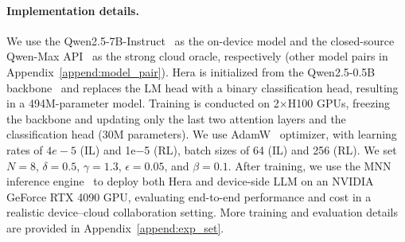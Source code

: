 \documentclass{article}
\newcommand{\needrev}[1]{{\color{darkgreen}#1}} %
\newcommand{\needrev}[1]{#1} %
\newcommand{\name}{Hera\xspace}
\begin{document}
\paragraph{Implementation details.}
We use the Qwen2.5-7B-Instruct~\citep{yang2024qwen25} as the on-device model and the closed-source Qwen-Max API~\citep{qwen2.5-max2025} as the strong cloud oracle, respectively (other model pairs in Appendix~\ref{append:model_pair}).
\name is initialized from the Qwen2.5-0.5B backbone~\citep{yang2024qwen25} and replaces the LM head with a binary classification head, resulting in a 494M-parameter model.
Training is conducted on 2$\times$H100 GPUs, freezing the backbone and updating only the last two attention layers and the classification head (30M parameters).
We use AdamW~\citep{loshchilov2018decoupled} optimizer,
with learning rates of $4e-5$ (IL) and 1e$-$5 (RL), batch sizes of 64 (IL) and 256 (RL).
We set $N=8$, $\delta=0.5$, $\gamma=1.3$, $\epsilon=0.05$, and $\beta=0.1$.
After training, we use the MNN inference engine~\citep{alibaba2020mnn} to deploy both \name and device-side LLM on an NVIDIA GeForce RTX 4090 GPU, evaluating end-to-end performance and cost in a realistic device--cloud collaboration setting.
More training and evaluation details are provided in Appendix~\ref{append:exp_set}.


\vspace{-.5em}
\end{document}
